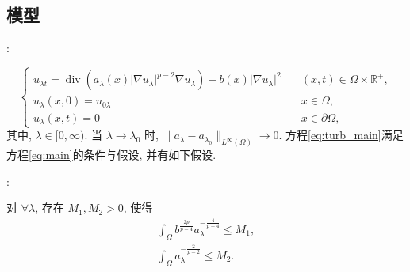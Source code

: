 \documentclass[UTF8]{ctexbeamer}
\newcommand*\abs[1]{\lvert#1\rvert}
\newcommand*\norm[1]{\lVert#1\rVert}
\newcommand\R{\mathbb{R}}
\DeclareMathOperator{\Div}{div}
\begin{document}
\subsection{模型}
\begin{frame}{\secname : \subsecname}

    \begin{equation}\label{eq:turb_main}
        \begin{cases}
            u_{\lambda t} = \Div(a_{\lambda}(x)\abs{\nabla u_{\lambda}}^{p-2}\nabla u_{\lambda}) - b(x)\abs{\nabla u_{\lambda}}^2
            \quad &(x, t) \in \Omega \times \R^+,\\
            u_{\lambda}(x,0) = u_{0\lambda} \quad &x \in \Omega,\\
            u_{\lambda}(x, t) = 0 \quad &x \in \partial\Omega,
        \end{cases}
    \end{equation}
    其中, $\lambda \in [0, \infty)$. 当 $\lambda \to \lambda_0$ 时, $\norm{a_\lambda - a_{\lambda_0}}_{L^\infty(\Omega)} \to 0$.
    方程\eqref{eq:turb_main}满足方程\eqref{eq:main}的条件与假设, 并有如下假设.

\end{frame}
\begin{frame}{\secname : \subsecname}

    对 $\forall \lambda$, 存在 $M_1, M_2 > 0$, 使得
    \begin{gather}
        \int_{\Omega} b^{\frac{2p}{p-4}}a_\lambda^{-\frac{4}{p-4}} \leq M_1, \label{h1} \\
        \int_{\Omega}a_\lambda^{-\frac{2}{p-2}} \leq M_2. \label{h2}
    \end{gather}

\end{frame}
\end{document}
